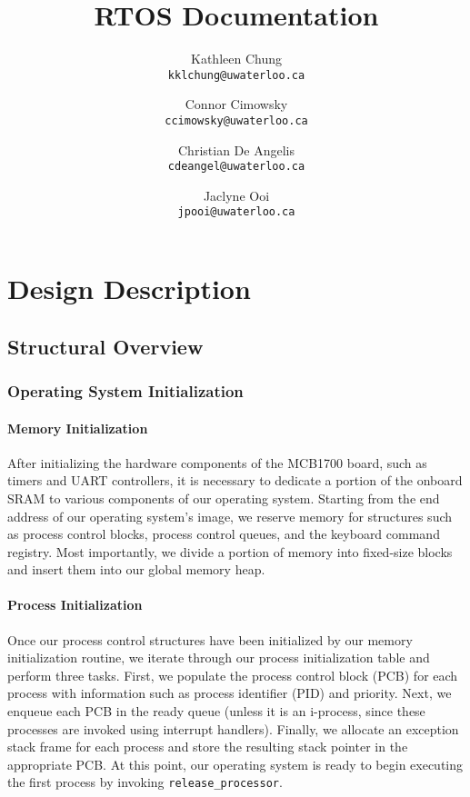 \documentclass[12pt]{report}
\begin{document}
\title{RTOS Documentation}

\author{
    Kathleen Chung\\
    \texttt{kklchung@uwaterloo.ca}
    \and
    Connor Cimowsky\\
    \texttt{ccimowsky@uwaterloo.ca}
    \and
    Christian De Angelis\\
    \texttt{cdeangel@uwaterloo.ca}
    \and
    Jaclyne Ooi\\
    \texttt{jpooi@uwaterloo.ca}
}

\maketitle

\tableofcontents

\part{Design Description}

\chapter{Structural Overview}

\section{Operating System Initialization}

\subsection{Memory Initialization}

After initializing the hardware components of the MCB1700 board, such as timers and UART controllers, it is necessary to dedicate a portion of the onboard SRAM to various components of our operating system. Starting from the end address of our operating system's image, we reserve memory for structures such as process control blocks, process control queues, and the keyboard command registry. Most importantly, we divide a portion of memory into fixed-size blocks and insert them into our global memory heap.

\subsection{Process Initialization}

Once our process control structures have been initialized by our memory initialization routine, we iterate through our process initialization table and perform three tasks. First, we populate the process control block (PCB) for each process with information such as process identifier (PID) and priority. Next, we enqueue each PCB in the ready queue (unless it is an i-process, since these processes are invoked using interrupt handlers). Finally, we allocate an exception stack frame for each process and store the resulting stack pointer in the appropriate PCB. At this point, our operating system is ready to begin executing the first process by invoking \texttt{release_processor}.
\end{document}
